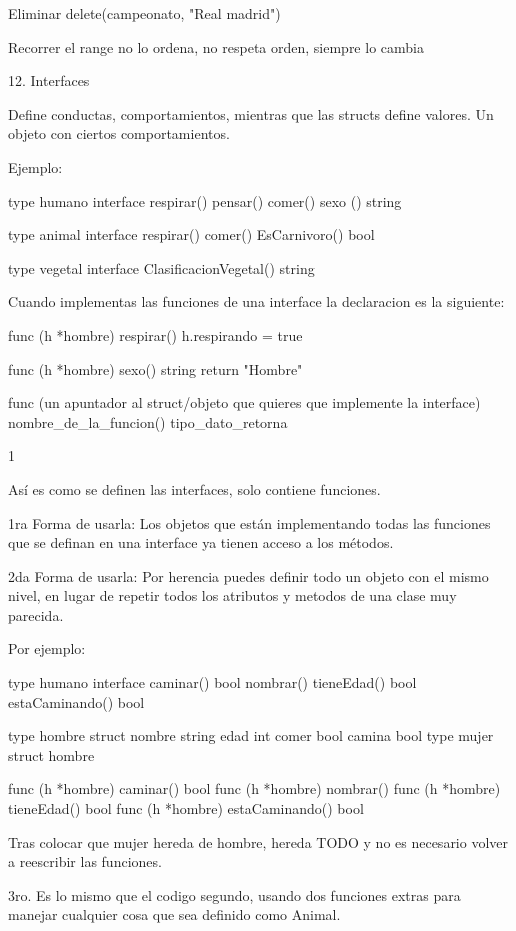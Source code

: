 Eliminar
    delete(campeonato, "Real madrid")

Recorrer 
    el range no lo ordena, no respeta orden, siempre lo cambia


12. Interfaces

Define conductas, comportamientos, mientras que las structs define valores.
Un objeto con ciertos comportamientos. 

Ejemplo:

type humano interface{
    respirar()
    pensar()
    comer()
    sexo () string
} 

type animal interface{
    respirar()
    comer()
    EsCarnivoro() bool
}

type vegetal interface{
    ClasificacionVegetal() string
}


Cuando implementas las funciones de una interface la declaracion
es la siguiente:

    func (h *hombre) respirar()  {
        h.respirando = true
    }

    func (h *hombre) sexo() string {
        return "Hombre"
    }

func (un apuntador al struct/objeto que quieres que implemente la interface) nombre_de_la_funcion() tipo_dato_retorna {1

}


Así es como se definen las interfaces, solo contiene funciones.

1ra Forma de usarla:
Los objetos que están implementando todas las funciones que se definan en una 
interface ya tienen acceso a los métodos.

2da Forma de usarla:
Por herencia puedes definir todo un objeto con el mismo nivel, en lugar de repetir todos los atributos y metodos de una clase muy parecida.

Por ejemplo:

type humano interface{
    caminar() bool
    nombrar()
    tieneEdad() bool
    estaCaminando() bool
}   

type hombre struct{
    nombre string 
    edad int
    comer bool
    camina bool
}
type mujer struct{
    hombre
}

func (h *hombre) caminar() bool{
}
func (h *hombre) nombrar() {
}
func (h *hombre) tieneEdad() bool{
}
func (h *hombre) estaCaminando() bool{
}


Tras colocar que mujer hereda de hombre, hereda TODO y no es necesario volver a reescribir las funciones.

3ro. Es lo mismo que el codigo segundo, usando dos funciones extras para manejar cualquier cosa que sea definido como Animal.

